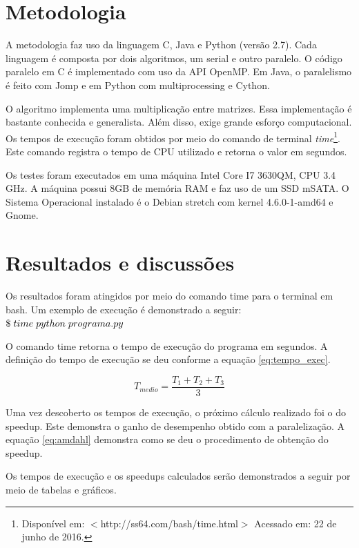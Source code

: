 \documentclass[a4paper,12pt]{article}
\begin{document}
\section{Metodologia}
A metodologia faz uso da linguagem C, Java e Python (versão 2.7). Cada linguagem é composta por dois algoritmos, um serial e outro paralelo. O código paralelo em C é implementado com uso da API OpenMP. Em Java, o paralelismo é feito com Jomp e em Python com multiprocessing e Cython. 

O algoritmo implementa uma multiplicação entre matrizes. Essa implementação é bastante conhecida e generalista. Além disso, exige grande esforço computacional. Os tempos de execução foram obtidos por meio do comando de terminal {\it time}\footnote{Disponível em: $<$http://ss64.com/bash/time.html$>$ Acessado em: 22 de junho de 2016.}. Este comando registra o tempo de CPU utilizado e retorna o valor em segundos.  

Os testes foram executados em uma máquina Intel Core I7 3630QM, CPU 3.4 GHz. A máquina possui 8GB de memória RAM e faz uso de um SSD mSATA. O Sistema Operacional instalado é o Debian stretch com kernel 4.6.0-1-amd64 e Gnome.

\section{Resultados e discussões}

Os resultados foram atingidos por meio do comando time para o terminal em bash. Um exemplo de execução é demonstrado a seguir: 
$\$\hspace{0.1cm} time \hspace{0.1cm} python \hspace{0.1cm}programa.py$

O comando time retorna o tempo de execução do programa em segundos. A definição do tempo de execução se deu conforme a equação \ref{eq:tempo_exec}.

\begin{equation}
  \label{eq:tempo_exec}
   T_{medio} = \frac{T_{1} + T_{2} + T_{3}}{3}
\end{equation}

Uma vez descoberto os tempos de execução, o próximo cálculo realizado foi o do speedup. Este demonstra o ganho de desempenho obtido com a paralelização. A equação \hyperlink{eq:amdahl}{\ref{eq:amdahl}} demonstra como se deu o procedimento de obtenção do speedup.

Os tempos de execução e os speedups calculados serão demonstrados a seguir por meio de tabelas e gráficos. 
\end{document}

